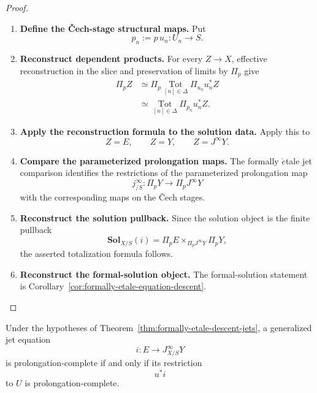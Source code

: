 \begin{proof}
\leavevmode
\begin{enumerate}[label=\textup{(\arabic*)}]
    \item \textbf{Define the Čech-stage structural maps.}
Put
\[
  p_n:=p\,u_n:U_n\to S.
\]

    \item \textbf{Reconstruct dependent products.}
For every \(Z\to X\), effective reconstruction in the slice and preservation
of limits by \(\Pi_p\) give
\[
\begin{aligned}
  \Pi_pZ
  &\simeq
  \Pi_p
  \operatorname*{Tot}_{[n]\in\Delta}
  \Pi_{u_n}u_n^*Z\\
  &\simeq
  \operatorname*{Tot}_{[n]\in\Delta}
  \Pi_{p_n}u_n^*Z.
\end{aligned}
\]

    \item \textbf{Apply the reconstruction formula to the solution data.}
Apply this to
\[
  Z=E,
  \qquad
  Z=Y,
  \qquad
  Z=J^\infty Y.
\]

    \item \textbf{Compare the parameterized prolongation maps.}
The formally \(\acute{e}\)tale jet comparison identifies the restrictions of
the parameterized prolongation map
\[
  j^\infty_{/S}:\Pi_pY\to\Pi_pJ^\infty Y
\]
with the corresponding maps on the \v{C}ech stages.

    \item \textbf{Reconstruct the solution pullback.}
Since the solution object
is the finite pullback
\[
  \mathbf{Sol}_{X/S}(i)
  =
  \Pi_pE
  \times_{\Pi_pJ^\infty Y}
  \Pi_pY,
\]
the asserted totalization formula follows.

    \item \textbf{Reconstruct the formal-solution object.}
The formal-solution statement is
Corollary~\ref{cor:formally-etale-equation-descent}.
\end{enumerate}
\end{proof}

\begin{corollary}
\label{cor:formally-etale-prolongation-local}
Under the hypotheses of
Theorem~\ref{thm:formally-etale-descent-jets}, a generalized jet equation
\[
  i:E\to J^\infty_{X/S}Y
\]
is prolongation-complete if and only if its restriction
\[
  u^*i
\]
to \(U\) is prolongation-complete.
\end{corollary}


